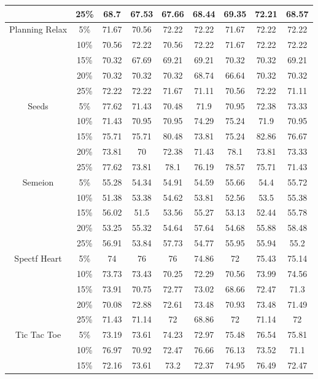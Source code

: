 \begin{longtable}[c]{|c|c|c|c|c|c|c|c|c|}
& 25\% & 68.7 & 67.53 & 67.66 & 68.44 & 69.35 & 72.21 & 68.57 \\ \hline
\multirow{5}{*}{Planning Relax}
& 5\% & 71.67 & 70.56 & 72.22 & 72.22 & 71.67 & 72.22 & 72.22 \\
& 10\% & 70.56 & 72.22 & 70.56 & 72.22 & 71.67 & 72.22 & 72.22 \\
& 15\% & 70.32 & 67.69 & 69.21 & 69.21 & 70.32 & 70.32 & 69.21 \\
& 20\% & 70.32 & 70.32 & 70.32 & 68.74 & 66.64 & 70.32 & 70.32 \\
& 25\% & 72.22 & 72.22 & 71.67 & 71.11 & 70.56 & 72.22 & 71.11 \\ \hline
\multirow{5}{*}{Seeds}
& 5\% & 77.62 & 71.43 & 70.48 & 71.9 & 70.95 & 72.38 & 73.33 \\
& 10\% & 71.43 & 70.95 & 70.95 & 74.29 & 75.24 & 71.9 & 70.95 \\
& 15\% & 75.71 & 75.71 & 80.48 & 73.81 & 75.24 & 82.86 & 76.67 \\
& 20\% & 73.81 & 70 & 72.38 & 71.43 & 78.1 & 73.81 & 73.33 \\
& 25\% & 77.62 & 73.81 & 78.1 & 76.19 & 78.57 & 75.71 & 71.43 \\ \hline
\multirow{5}{*}{Semeion}
& 5\% & 55.28 & 54.34 & 54.91 & 54.59 & 55.66 & 54.4 & 55.72 \\
& 10\% & 51.38 & 53.38 & 54.62 & 53.81 & 52.56 & 53.5 & 55.38 \\
& 15\% & 56.02 & 51.5 & 53.56 & 55.27 & 53.13 & 52.44 & 55.78 \\
& 20\% & 53.25 & 55.32 & 54.64 & 57.64 & 54.68 & 55.88 & 58.48 \\
& 25\% & 56.91 & 53.84 & 57.73 & 54.77 & 55.95 & 55.94 & 55.2 \\ \hline
\multirow{5}{*}{Spectf Heart}
& 5\% & 74 & 76 & 76 & 74.86 & 72 & 75.43 & 75.14 \\
& 10\% & 73.73 & 73.43 & 70.25 & 72.29 & 70.56 & 73.99 & 74.56 \\
& 15\% & 73.91 & 70.75 & 72.77 & 73.02 & 68.66 & 72.47 & 71.3 \\
& 20\% & 70.08 & 72.88 & 72.61 & 73.48 & 70.93 & 73.48 & 71.49 \\
& 25\% & 71.43 & 71.14 & 72 & 68.86 & 72 & 71.14 & 72 \\ \hline
\multirow{5}{*}{Tic Tac Toe}
& 5\% & 73.19 & 73.61 & 74.23 & 72.97 & 75.48 & 76.54 & 75.81 \\
& 10\% & 76.97 & 70.92 & 72.47 & 76.66 & 76.13 & 73.52 & 71.1 \\
& 15\% & 72.16 & 73.61 & 73.2 & 72.37 & 74.95 & 76.49 & 72.47 \\

\end{longtable}
